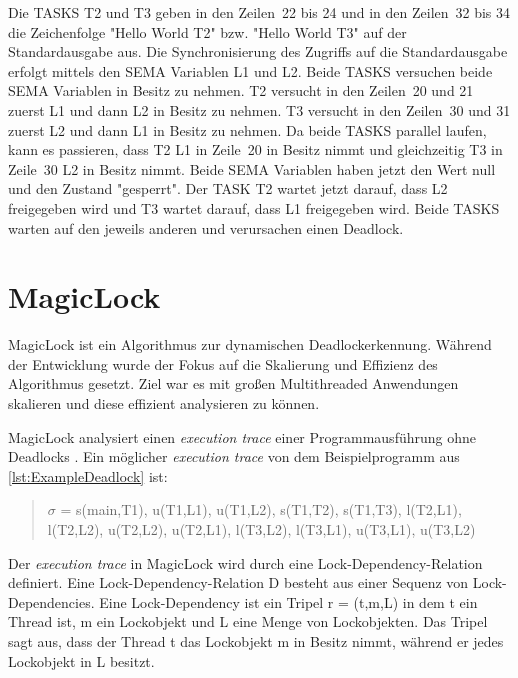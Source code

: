 Die \textrm{TASKS} \textrm{T2} und \textrm{T3} geben in den Zeilen~22 bis 24 und
in den Zeilen~32 bis 34 die Zeichenfolge "Hello World T2" bzw. "Hello World T3"
auf der Standardausgabe aus. Die Synchronisierung des Zugriffs auf die
Standardausgabe erfolgt mittels den \textrm{SEMA} Variablen \textrm{L1} und
\textrm{L2}. Beide \textrm{TASKS} versuchen beide \textrm{SEMA} Variablen in
Besitz zu nehmen. \textrm{T2} versucht in den Zeilen~20 und 21 zuerst
\textrm{L1} und dann \textrm{L2} in Besitz zu nehmen. \textrm{T3} versucht in
den Zeilen~30 und 31 zuerst \textrm{L2} und dann \textrm{L1} in Besitz zu
nehmen. Da beide \textrm{TASKS} parallel laufen, kann es passieren, dass
\textrm{T2} \textrm{L1} in Zeile~20 in Besitz nimmt und gleichzeitig \textrm{T3}
in Zeile~30 \textrm{L2} in Besitz nimmt. Beide \textrm{SEMA} Variablen haben
jetzt den Wert null und den Zustand "gesperrt". Der \textrm{TASK} \textrm{T2}
wartet jetzt darauf, dass \textrm{L2} freigegeben wird und
\textrm{T3} wartet darauf, dass \textrm{L1} freigegeben wird. Beide \textrm{TASKS}
warten auf den jeweils anderen und verursachen einen Deadlock.

\section{MagicLock}
\label{section:MagicLock}
MagicLock ist ein Algorithmus zur dynamischen Deadlockerkennung. Während der
Entwicklung wurde der Fokus auf die Skalierung und Effizienz des Algorithmus
gesetzt. Ziel war es mit großen Multithreaded Anwendungen skalieren und diese
effizient analysieren zu können.\autocite[vgl.][1]{MagicLock}

MagicLock analysiert einen \emph{execution trace} einer Programmausführung ohne
Deadlocks \autocite[vgl.][4]{MagicLock}. Ein möglicher \emph{execution trace}
von dem Beispielprogramm aus \cref{lst:ExampleDeadlock} ist:
\begin{quote}
  \textbf{$\sigma$} = s(main,T1), u(T1,L1), u(T1,L2), s(T1,T2), s(T1,T3),
  l(T2,L1), l(T2,L2), u(T2,L2), u(T2,L1), l(T3,L2), l(T3,L1), u(T3,L1), u(T3,L2)
\end{quote}
Der \emph{execution trace} in MagicLock wird durch eine Lock-Dependency-Relation
definiert. Eine Lock-Dependency-Relation \textrm{D} besteht aus einer Sequenz
von Lock-Dependencies. Eine Lock-Dependency ist ein Tripel \textrm{r = (t,m,L)}
in dem \textrm{t} ein Thread ist, \textrm{m} ein Lockobjekt und \textrm{L} eine
Menge von Lockobjekten. Das Tripel sagt aus, dass der Thread \textrm{t} das
Lockobjekt
\textrm{m} in Besitz nimmt, während er jedes Lockobjekt in \textrm{L} besitzt.\autocite[vgl.][3]{MagicLock}

